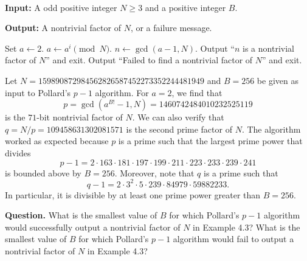 \begin{algo}~

    {\bf Input:} A odd positive integer $N \geq 3$ and a positive integer $B$. 
    
    {\bf Output:} A nontrivial factor of $N$, or a failure message. \vspace{0.5em}
    
    \begin{algorithmic}[1]
        \State Set $a \gets 2$. 
            \State $a \gets a^i \pmod N$.
        \EndFor 
        \State $n \gets \gcd(a - 1, N)$. 
            \State Output ``$n$ is a nontrivial factor of $N$'' and exit. 
        \Else 
            \State Output ``Failed to find a nontrivial factor of $N$'' and exit.
        \EndIf 
    \end{algorithmic}
\end{algo}

\begin{exmp}
    Let $N = 159890872984562826587452273352244481949$ and $B = 256$ be given 
    as input to Pollard's $p-1$ algorithm. For $a = 2$, we find that 
    \[ p = \gcd(a^{B!} - 1, N) = 1460742484010232525119 \] 
    is the $71$-bit nontrivial factor of $N$. We can also verify that 
    $q = N/p = 109458631302081571$ is the second prime factor of $N$. The 
    algorithm worked as expected because $p$ is a prime such that the 
    largest prime power that divides 
    \[ p - 1 = 2 \cdot 163 \cdot 181 \cdot 197 \cdot 199 \cdot 211 \cdot 223 
    \cdot 233 \cdot 239 \cdot 241 \] 
    is bounded above by $B = 256$. Moreover, note that $q$ is a prime such that 
    \[ q - 1 = 2 \cdot 3^2 \cdot 5 \cdot 239 \cdot 84979 \cdot 59882233. \] 
    In particular, it is divisible by at least one prime power greater than 
    $B = 256$.  
\end{exmp}

{\bf Question.} What is the smallest value of $B$ for which Pollard's $p-1$ 
algorithm would successfully output a nontrivial factor of $N$ in Example 4.3?
What is the smallest value of $B$ for which Pollard's $p-1$ 
algorithm would fail to output a nontrivial factor of $N$ in Example 4.3? 

